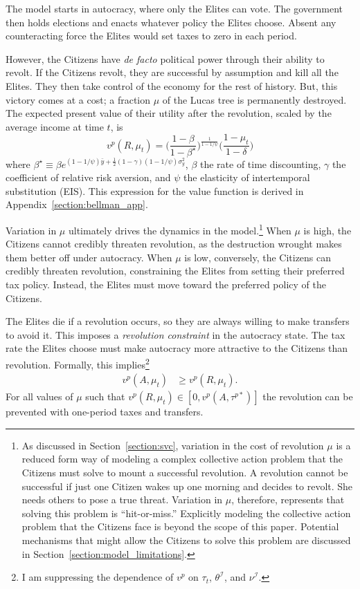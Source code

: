 \documentclass[12pt]{article}
\numberwithin{equation}{section}
\begin{document}
The model starts in autocracy,  where only the Elites can vote.  The government then holds elections and enacts whatever policy the Elites choose.  Absent any counteracting force the Elites would set taxes to zero in each period. 

However, the Citizens have \textit{de facto} political power through their ability to revolt. If the Citizens revolt, they are successful by assumption and kill all the Elites. They then take control of the economy for the rest of history. But, this victory comes at a cost; a fraction $\mu$ of the Lucas tree is permanently destroyed. The expected present value of their utility after the revolution, scaled by the average income at time $t$, is
\begin{equation}
v^{p}(R,\mu_{t})=\bigg(\frac{1-\beta}{1-\beta^{\star}}\bigg)^{\frac{1}{1-1/\psi}}\bigg(\frac{1-\mu_t}{1-\delta}\bigg)\label{eq:revolution}
\end{equation}
where  $\beta^{\star} \equiv \beta e^{(1-1/\psi)\bar{y}+\frac{1}{2}(1-\gamma)(1-1/\psi)\sigma_{y}^{2}}$, $\beta$ the rate of time discounting, $\gamma$ the coefficient of relative risk aversion, and $\psi$ the  elasticity of intertemporal substitution (EIS). This expression for the value function is derived in Appendix~\ref{section:bellman_app}.

Variation in $\mu$ ultimately drives the dynamics in the model.\footnote{As discussed in Section~\ref{section:svc}, variation in the cost of revolution $\mu$ is a reduced form way of modeling a complex collective action problem that the Citizens must solve to mount a successful revolution. A revolution cannot be successful if just one Citizen wakes up one morning and decides to revolt. She needs others to pose a true threat. Variation in $\mu$, therefore, represents that solving this problem is ``hit-or-miss.'' Explicitly modeling the collective action problem that the Citizens face is beyond the scope of this paper.  Potential mechanisms that might allow the Citizens to solve this problem are discussed in Section~\ref{section:model_limitations}.} When $\mu$ is high, the Citizens cannot credibly threaten revolution, as the destruction wrought makes them better off under autocracy. When $\mu$ is low, conversely, the Citizens can credibly threaten revolution, constraining the Elites from setting their preferred tax policy. Instead, the Elites must move toward the preferred policy of the Citizens.

The Elites die if a revolution occurs, so they are always willing to make transfers to avoid it. This imposes a \textit{revolution constraint} in the autocracy state. The tax rate the Elites choose  must make autocracy more attractive to the Citizens than revolution. Formally, this implies\footnote{I am suppressing the dependence of $v^p$ on $\tau_t$, $\theta^\mathcal{I}$, and $\nu^\mathcal{I}$.}
\begin{align}
v^{p}(A, \mu_{t}) & \geq v^p(R,\mu_{t}).\label{eq:constraint}
\end{align}
For all values of $\mu$ such that $v^p(R,\mu_{t}) \in [0,v^{p}(A, \tau^{p*})]$ the revolution can be prevented with one-period taxes and transfers.
\end{document}
